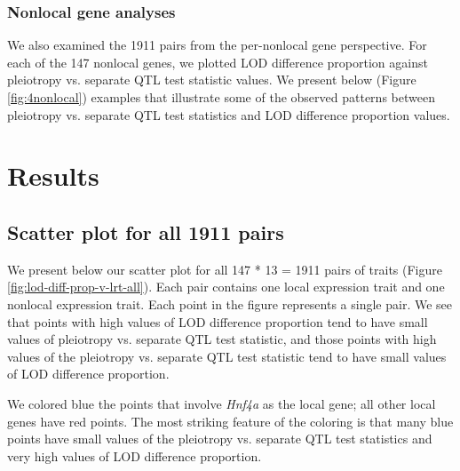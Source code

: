 \documentclass{article}
\begin{document}
\begin{boehm}
\subsubsection{Nonlocal gene analyses}

We also examined the 1911 pairs from the per-nonlocal gene perspective. For each of the 147 nonlocal genes, we plotted LOD difference proportion against pleiotropy vs. separate QTL test statistic values. We present below (Figure \ref{fig:4nonlocal}) examples that illustrate some of the observed patterns between pleiotropy vs. separate QTL test statistics and LOD difference proportion values.


\section{Results}

\subsection{Scatter plot for all 1911 pairs}

We present below our scatter plot for all 147 * 13 = 1911 pairs of traits (Figure \ref{fig:lod-diff-prop-v-lrt-all}). Each pair contains one local expression trait and one nonlocal expression trait. Each point in the figure represents a single pair. We see that points with high values of LOD difference proportion tend to have small values of pleiotropy vs. separate QTL test statistic, and those points with high values of the pleiotropy vs. separate QTL test statistic tend to have small values of LOD difference proportion.

We colored blue the points that involve \emph{Hnf4a} as the local gene; all other local genes have red points. The most striking feature of the coloring is that many blue points have small values of the pleiotropy vs. separate QTL test statistics and very high values of LOD difference proportion.




\end{boehm}
\end{document}
